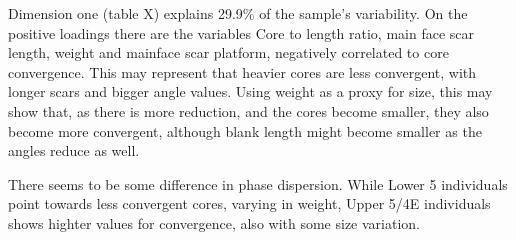 \documentclass[12pt,twoside]{reedthesis}
\begin{document}
Dimension one (table X) explains 29.9\% of the sample's variability. On the positive loadings there are the variables Core to length ratio, main face scar length, weight and mainface scar platform, negatively correlated to core convergence. This may represent that heavier cores are less convergent, with longer scars and bigger angle values. Using weight as a proxy for size, this may show that, as there is more reduction, and the cores become smaller, they also become more convergent, although blank length might become smaller as the angles reduce as well.

There seems to be some difference in phase dispersion. While Lower 5 individuals point towards less convergent cores, varying in weight, Upper 5/4E individuals shows highter values for convergence, also with some size variation.
\end{document}
